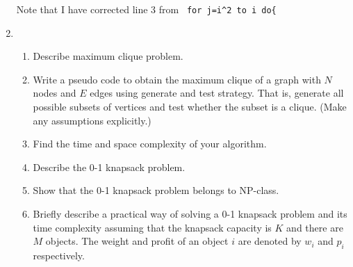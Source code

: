 \begin{enumerate}
	Note that I have corrected line 3 from \ \verb|for j=i^2 to i do{|
	
	
	\item\begin{enumerate}[label=\alph*.]
		\item Describe maximum clique problem.
		\item Write a pseudo code to obtain the maximum clique of a graph with $N$ nodes and $E$ edges using generate and test strategy.  That is, generate all possible subsets of vertices and test whether the subset is a clique.  (Make any assumptions explicitly.)
		\item Find the time and space complexity of your algorithm.
		\item Describe the 0-1 knapsack problem.
		\item Show that the 0-1 knapsack problem belongs to NP-class.
		\item Briefly describe a practical way of solving a 0-1 knapsack problem and its time complexity assuming that the knapsack capacity is $K$ and there are $M$ objects.  The weight and profit of an object $i$ are denoted by $w_i$ and $p_i$ respectively.  
	\end{enumerate}
	
	
\end{enumerate}

